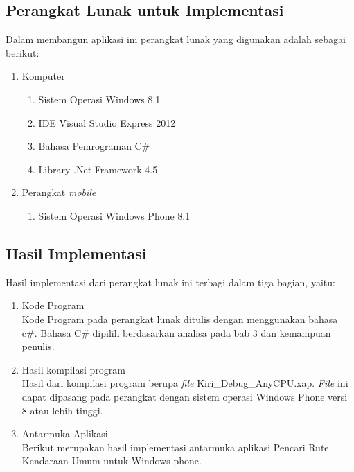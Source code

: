 \subsection{Perangkat Lunak untuk Implementasi}
\label{lab:Perangkat Lunak untuk Implementasi}
\hspace{0.5cm} Dalam membangun aplikasi ini perangkat lunak yang digunakan adalah sebagai berikut:
\begin{enumerate}
	\item Komputer
		\begin{enumerate}
			\item Sistem Operasi Windows 8.1
			\item IDE Visual Studio Express 2012
			\item Bahasa Pemrograman C\#
			\item Library .Net Framework 4.5
		\end{enumerate}
		
	\item Perangkat \textit{mobile}
		\begin{enumerate}
			\item Sistem Operasi Windows Phone 8.1
		\end{enumerate}
\end{enumerate}

\subsection{Hasil Implementasi}
\label{lab:Hasil Implementasi}
\hspace{0.5cm} Hasil implementasi dari perangkat lunak ini terbagi dalam tiga bagian, yaitu:
\begin{enumerate}
	\item Kode Program \\
	Kode Program pada perangkat lunak ditulis dengan menggunakan bahasa c\#. Bahasa C\# dipilih berdasarkan analisa pada bab 3 dan kemampuan penulis.
	\item Hasil kompilasi program \\
	Hasil dari kompilasi program berupa \textit{file} Kiri\_Debug\_AnyCPU.xap. \textit{File} ini dapat dipasang pada perangkat dengan sistem operasi Windows Phone versi 8 atau lebih tinggi.
	\item Antarmuka Aplikasi \\
	Berikut merupakan hasil implementasi antarmuka aplikasi Pencari Rute Kendaraan Umum untuk Windows phone.
\end{enumerate}

